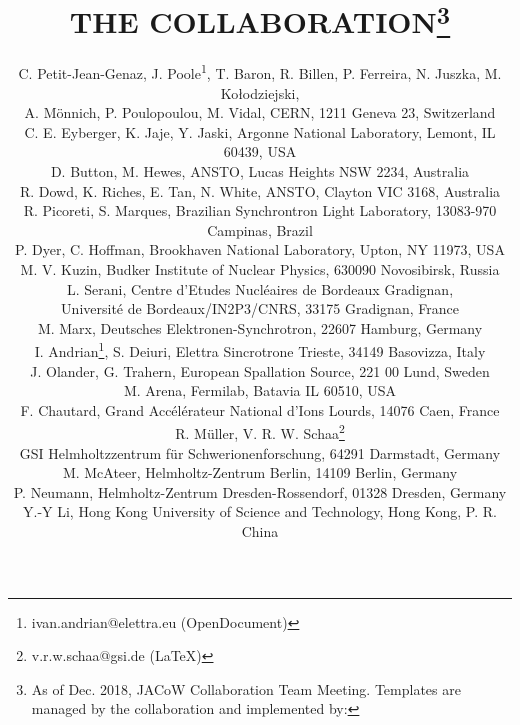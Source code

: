 \documentclass[a4paper,
               keeplastbox,   %
                luatex,       %
               ]{jacow}
\begin{document}
	\title{THE  COLLABORATION\thanks{{As of Dec. 2018, JACoW Collaboration Team Meeting. \newline
	Templates are managed by the collaboration and implemented by:}}}

	\author{C. Petit-Jean-Genaz, J. Poole\textsuperscript{1}, T. Baron, R. Billen, 
			P. Ferreira, N. Juszka, M. Kołodziejski,\\
			A. Mönnich, P. Poulopoulou, M. Vidal, CERN, 1211 Geneva 23, Switzerland \\
		C. E. Eyberger, K. Jaje, Y. Jaski, Argonne National Laboratory, Lemont, IL 60439, USA \\
		D. Button, M. Hewes, ANSTO, Lucas Heights NSW 2234, Australia \\
		R. Dowd, K. Riches, E. Tan, N. White, ANSTO, Clayton VIC 3168, Australia \\
		R. Picoreti, S. Marques, Brazilian Synchrontron Light Laboratory, 13083-970 Campinas, Brazil \\
		P. Dyer, C. Hoffman, Brookhaven National Laboratory, Upton, NY 11973, USA \\
		M. V. Kuzin, Budker Institute of Nuclear Physics, 630090 Novosibirsk, Russia \\
		L. Serani, Centre d’Etudes Nucléaires de Bordeaux Gradignan, \\
		Université de Bordeaux/IN2P3/CNRS, 33175 Gradignan, France  \\
		M. Marx, Deutsches Elektronen-Synchrotron, 22607 Hamburg, Germany \\
		I. Andrian\thanks{ivan.andrian@elettra.eu (OpenDocument)}, 
				  S. Deiuri, Elettra Sincrotrone Trieste, 34149 Basovizza, Italy \\
		J. Olander, G. Trahern, European Spallation Source, 221 00 Lund, Sweden \\
		M. Arena, Fermilab, Batavia IL 60510, USA \\
		F. Chautard, Grand Accélérateur National d'Ions Lourds, 14076 Caen, France \\
		R. Müller, V. R. W. Schaa\thanks{v.r.w.schaa@gsi.de (\LaTeX)} \\
		GSI Helmholtzzentrum für Schwerionenforschung, 64291 Darmstadt, Germany \\
		M. McAteer, Helmholtz-Zentrum Berlin, 14109 Berlin, Germany \\
		P. Neumann, Helmholtz-Zentrum Dresden-Rossendorf, 01328 Dresden, Germany \\
		Y.-Y Li, Hong Kong University of Science and Technology, Hong Kong, P. R. China \\
}
\end{document}
